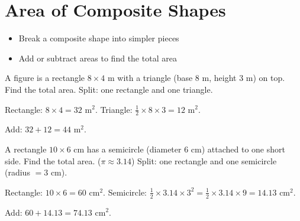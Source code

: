 \section{Area of Composite Shapes}

\begin{stepGoal}
\begin{itemize}
    \item Break a composite shape into simpler pieces
    \item Add or subtract areas to find the total area
\end{itemize}
\end{stepGoal}

\begin{stepVocabBox}
\end{stepVocabBox}

\begin{stepsCard}
\end{stepsCard}

\begin{stepExample}{A figure is a rectangle $8 \times 4$ m with a triangle (base $8$ m, height $3$ m) on top. Find the total area.}
     Split: one rectangle and one triangle.

     Rectangle: $8 \times 4 = 32$ m$^{2}$. \quad Triangle: $\frac{1}{2} \times 8 \times 3 = 12$ m$^{2}$.

     Add: $32 + 12 = 44$ m$^{2}$.
\end{stepExample}

\begin{stepExample}{A rectangle $10 \times 6$ cm has a semicircle (diameter $6$ cm) attached to one short side. Find the total area. ($\pi \approx 3.14$)}
     Split: one rectangle and one semicircle (radius $= 3$ cm).

     Rectangle: $10 \times 6 = 60$ cm$^{2}$. \quad Semicircle: $\frac{1}{2} \times 3.14 \times 3^{2} = \frac{1}{2} \times 3.14 \times 9 = 14.13$ cm$^{2}$.

     Add: $60 + 14.13 = 74.13$ cm$^{2}$.
\end{stepExample}

